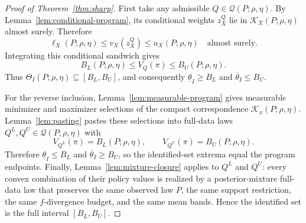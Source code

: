 \documentclass[11pt]{article}
\theoremstyle{definition}
\theoremstyle{plain}
\theoremstyle{remark}
\begin{document}
\begin{proof}[Proof of Theorem~\ref{thm:sharp}]
First take any admissible $Q\in\mathcal Q(P;\rho,\eta)$.  By
Lemma~\ref{lem:conditional-program}, its conditional weights
$z_X^Q$ lie in $\mathcal K_X(P;\rho,\eta)$ almost surely.  Therefore
\[
  \ell_X(P;\rho,\eta)\le v_X(z_X^Q)\le u_X(P;\rho,\eta)
  \quad\text{almost surely}.
\]
Integrating this conditional sandwich gives
\[
  B_L(P;\rho,\eta)\le V_Q(\pi)\le B_U(P;\rho,\eta).
\]
Thus $\Theta_I(P;\rho,\eta)\subseteq[B_L,B_U]$, and consequently
$\underline{\theta}_I\ge B_L$ and $\overline{\theta}_I\le B_U$.

For the reverse inclusion, Lemma~\ref{lem:measurable-program} gives measurable
minimizer and maximizer selections of the compact correspondence
$\mathcal K_x(P;\rho,\eta)$.  Lemma~\ref{lem:pasting} pastes these selections
into full-data laws $Q^L,Q^U\in\mathcal Q(P;\rho,\eta)$ with
\[
  V_{Q^L}(\pi)=B_L(P;\rho,\eta),\qquad
  V_{Q^U}(\pi)=B_U(P;\rho,\eta).
\]
Therefore $\underline{\theta}_I\le B_L$ and $\overline{\theta}_I\ge B_U$, so the
identified-set extrema equal the program endpoints.  Finally,
Lemma~\ref{lem:mixture-closure} applies to $Q^L$ and $Q^U$: every convex
combination of their policy values is realized by a posterior-mixture
full-data law that preserves the same observed law $P$, the same support
restriction, the same $f$-divergence budget, and the same mean bands.  Hence
the identified set is the full interval $[B_L,B_U]$.
\end{proof}
\end{document}
